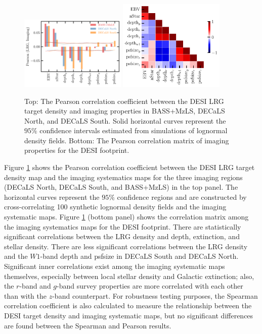 \begin{figure}
\centering
 \includegraphics[width=0.45\textwidth]{figures/pcc.pdf} 
 \includegraphics[width=0.45\textwidth]{figures/pccx.pdf}  
 \caption{Top: The Pearson correlation coefficient between the DESI LRG target density and imaging properties in BASS+MzLS, DECaLS North, and DECaLS South. Solid horizontal curves represent the $95\%$ confidence intervals estimated from simulations of lognormal density fields. Bottom: The Pearson correlation matrix of imaging properties for the DESI footprint.}
 \label{fig:pcc}
\end{figure}

Figure \ref{fig:pcc} shows the Pearson correlation coefficient between the DESI LRG target density map and the imaging systematics maps for the three imaging regions (DECaLS North, DECaLS South, and BASS+MzLS) in the top panel. The horizontal curves represent the $95\%$ confidence regions and are constructed by cross-correlating 100 synthetic lognormal density fields and the imaging systematic maps. Figure \ref{fig:pcc} (bottom panel) shows the correlation matrix among the imaging systematics maps for the DESI footprint. There are statistically significant correlations between the LRG density and depth, extinction, and stellar density. There are less significant correlations between the LRG density and the $W1$-band depth and psfsize in DECaLS South and DECaLS North. Significant inner correlations exist among the imaging systematic maps themselves, especially between local stellar density and Galactic extinction; also, the $r$-band and $g$-band survey properties are more correlated with each other than with the $z$-band counterpart. For robustness testing purposes, the Spearman correlation coefficient is also calculated to measure the relationship between the DESI target density and imaging systematic maps, but no significant differences are found between the Spearman and Pearson results.

